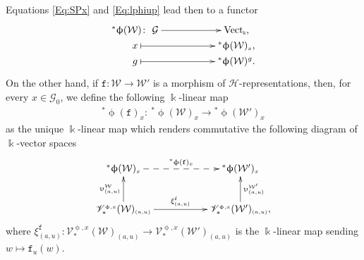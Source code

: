 \documentclass[pdftex]{sigma}
\numberwithin{equation}{section}
\newcommand{\Vect}{{\rm Vect}_{\Sscript{\Bbbk}}}
\newcommand{\tF}{\texttt{f}}
\newcommand{\Go}{\cG_{\Sscript{0}}}
\newcommand{\vV}{\mathscr{V}}
\newcommand{\cG}{{\mathcal G}}
\newcommand{\cH}{{\mathcal H}}
\newcommand{\cW}{{\mathcal W}}
\newcommand{\Sscript}[1]{\scriptscriptstyle{#1}}
\newcommand{\pls}{{}^{*}\upphi}
\begin{document}
Equations \eqref{Eq:SPx} and \eqref{Eq:lphiup} lead then to a functor
\begin{gather}\label{Eq:starphiup}
\begin{gathered}
\xymatrix@R=0pt{ \pls(\cW) \colon \ \cG \ar@{->}^-{}[rr] & & \Vect, \\ x \ar@{|->}^-{}[rr] & & \pls(\cW)_{\Sscript{x}}, \\ g \ar@{|->}[rr] & & \pls(\cW)^g. }
\end{gathered}
\end{gather}
On the other hand, if $\tF\colon \cW \to \cW'$ is a morphism of $\cH$-representations, then, for every $x \in \Go$, we define the following $\Bbbk$-linear map
\begin{gather}\label{Eq:pf}
{}^*\upphi(\tF)_{\Sscript{x}}\colon \ {}^*\upphi(\cW)_{\Sscript{x}} \longrightarrow {}^*\upphi(\cW')_{\Sscript{x}}
\end{gather}
as the unique $\Bbbk$-linear map which renders commutative the following diagram of $\Bbbk$-vector spaces
\begin{gather*}
\xymatrix@R=25pt{ \pls(\cW)_{\Sscript{x}} \ar@{-->}^-{\pls(\tF)_{\Sscript{x}}}[rr] & & \pls(\cW')_{\Sscript{x}} \\ \vV^{\Sscript{\upphi, x}}_*(\cW)_{\Sscript{(a, u)}}
\ar@{->}^-{\upupsilon^{\Sscript{\cW}}_{\Sscript{(a, u)}}}[u] \ar@{->}^-{\xi^{\Sscript{\tF}}_{\Sscript{(a, u)}}}[rr] & & \ar@{->}_-{\upupsilon^{\Sscript{\cW'}}_{\Sscript{(a, u)}}}[u]
\vV^{\Sscript{\upphi, x}}_*(\cW')_{\Sscript{(a, u)}}, }
\end{gather*}
where $\xi^{\Sscript{\tF}}_{\Sscript{(a, u)}}\colon \vV^{\Sscript{\upphi, x}}_*(\cW)_{\Sscript{(a, u)}} \to \vV^{\Sscript{\upphi, x}}_*(\cW')_{\Sscript{(a, u)}} $ is the $\Bbbk$-linear map sending $w \mapsto \tF_{\Sscript{u}}(w)$.
\end{document}
